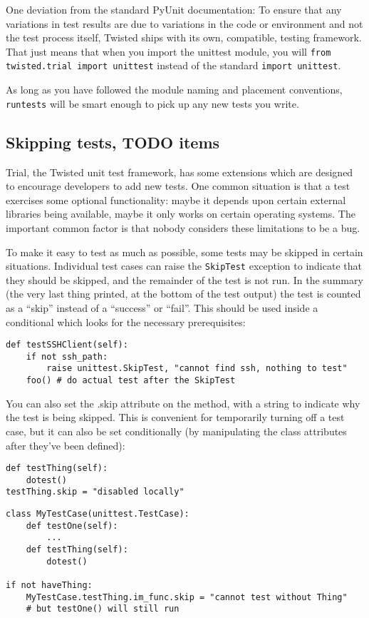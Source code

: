 One deviation from the standard PyUnit documentation: To ensure     that any variations in test results are due to variations in the     code or environment and not the test process itself, Twisted ships     with its own, compatible, testing framework.  That just     means that when you import the unittest module, you will \texttt{from twisted.\linebreak[1]trial import unittest} instead of the     standard \texttt{import unittest}.

As long as you have followed the module naming and placement     conventions, \texttt{runtests} will be smart     enough to pick up any new tests you write.

\subsection{Skipping tests, TODO items}


Trial, the Twisted unit test framework, has some extensions which are designed to encourage developers to add new tests. One common situation is that a test exercises some optional functionality: maybe it depends upon certain external libraries being available, maybe it only works on certain operating systems. The important common factor is that nobody considers these limitations to be a bug.

To make it easy to test as much as possible, some tests may be skipped in certain situations. Individual test cases can raise the \texttt{Skip\linebreak[1]Test} exception to indicate that they should be skipped, and the remainder of the test is not run. In the summary (the very last thing printed, at the bottom of the test output) the test is counted as a ``skip'' instead of a ``success'' or ``fail''. This should be used inside a conditional which looks for the necessary prerequisites:\begin{verbatim}
def testSSHClient(self):
    if not ssh_path:
        raise unittest.SkipTest, "cannot find ssh, nothing to test"
    foo() # do actual test after the SkipTest
\end{verbatim}


You can also set the .skip attribute on the method, with a string to indicate why the test is being skipped. This is convenient for temporarily turning off a test case, but it can also be set conditionally (by manipulating the class attributes after they've been defined):\begin{verbatim}
def testThing(self):
    dotest()
testThing.skip = "disabled locally"
\end{verbatim}
\begin{verbatim}
class MyTestCase(unittest.TestCase):
    def testOne(self):
        ...
    def testThing(self):
        dotest()

if not haveThing:
    MyTestCase.testThing.im_func.skip = "cannot test without Thing"
    # but testOne() will still run
\end{verbatim}


